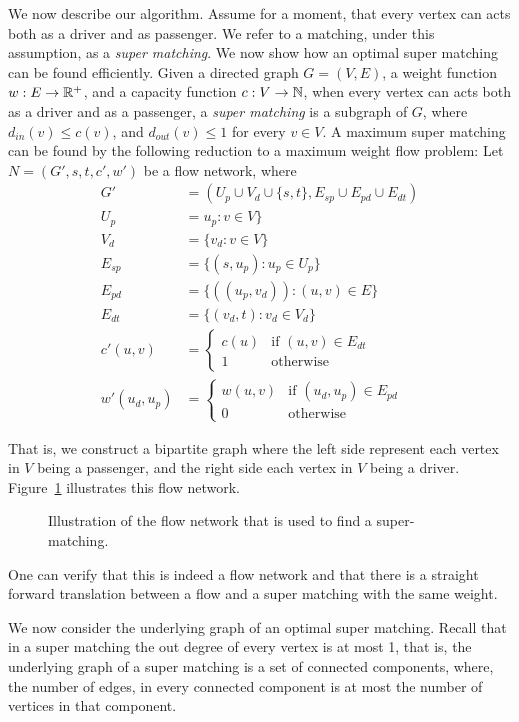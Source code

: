 We now describe our algorithm. 
Assume for a moment, 
that every vertex can acts both as a driver and as passenger.
We refer to a matching, under this assumption, as a \emph{super matching}.
We now show how an optimal super matching can be found efficiently.
Given a directed graph $G = (V, E)$,
a weight function $w : E \rightarrow \mathbb{R}^+$,
and a capacity function $c : V \rightarrow \mathbb{N}$, 
when every vertex can acts both as a driver and as a passenger, 
a \emph{super matching} is a subgraph of $G$, 
where $d_{in}(v) \leq c(v)$, and $d_{out}(v) \leq 1$ for every $v \in V$. 
A maximum super matching can be found by the following reduction 
to a maximum weight flow problem: 
Let $N = (G', s, t, c', w')$ be a flow network, where 
\begin{align*}
G'				& = (U_p \cup V_d \cup \{s, t\}, E_{sp} \cup E_{pd} \cup E_{dt})	\\
U_p				& = u_p : v \in V\} \\
V_d				& = \{v_d : v \in V\} \\
E_{sp}			& = \{ (s, u_p) : u_p \in U_p \} \\
E_{pd}			& = \{ ((u_p, v_d)) : (u, v) \in E \} \\
E_{dt}			& = \{ (v_d, t) : v_d \in V_d \} \\
c'(u, v)		& =
\begin{cases}
c(u) & \text{if } (u, v) \in E_{dt} \\
1 & \text{otherwise}	
\end{cases}
\\
w'(u_d, u_p)	& = 
\begin{cases}
w(u, v) & \text{if } (u_d, u_p) \in E_{pd} \\
0 & \text{otherwise}	
\end{cases}
\end{align*}

That is, 
we construct a bipartite graph where the left side represent each vertex 
in $V$ being a passenger,
and the right side each vertex in $V$ being a driver.
Figure~\ref{fig:cm-flow} illustrates this flow network.
%
\begin{figure}

\caption{
\label{fig:cm-flow}
Illustration of the flow network that is used to find a super-matching.
}
\end{figure}
%
One can verify that this is indeed a flow network and that there is a straight forward 
translation between a flow and a super matching with the same weight.

We now consider the underlying graph of an optimal super matching.
Recall that in a super matching the out degree of every vertex is at most 1,
that is, the underlying graph of a super matching is a set of connected components,
where, the number of edges, 
in every connected component is at most the number of vertices in that component.


